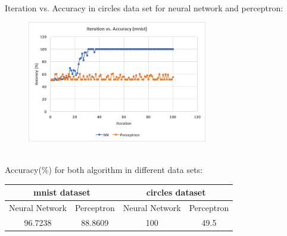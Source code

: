\begin{itemize}
\begin{figure}[h]
	\end{figure}	
	\\
	Iteration vs. Accuracy in circles data set for neural network and perceptron:
	\begin{figure}[h]
  		\centering
    	\includegraphics[width=0.7\textwidth]{fig5.png}
	\end{figure}	
	\\
	Accuracy(\%) for both algorithm in different data sets:\\
	\begin{tabular}{ | c | c | c | c | }
		\hline
		\multicolumn{2}{|c|}{mnist dataset} & \multicolumn{2}{c|}{circles dataset} \\ \hline
		Neural Network & Perceptron & Neural Network & Perceptron \\ \hline
		96.7238 & 88.8609 & 100 & 49.5  \\ \hline
	\end{tabular}


	\end{itemize}